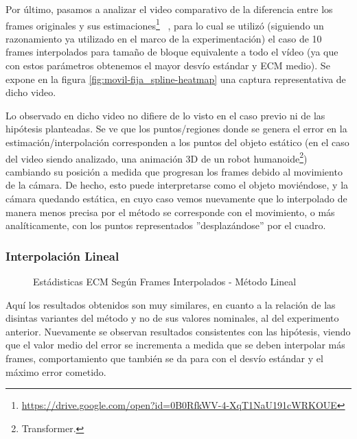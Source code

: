 \par Por \'ultimo, pasamos a analizar el video comparativo de la diferencia
entre los frames originales y sus
estimaciones\footnote{\url{https://drive.google.com/open?id=0B0RfkWV-4-XqT1NaU191cWRKOUE}}
~, para lo cual se utiliz\'o (siguiendo un razonamiento ya utilizado en el marco
de la experimentaci\'on) el caso de 10 frames interpolados para tama\~no de
bloque equivalente a todo el v\'ideo (ya que con estos par\'ametros obtenemos
el mayor desv\'io est\'andar y ECM medio). Se expone en la figura
\ref{fig:movil-fija_spline-heatmap} una captura representativa de dicho video.

\par Lo observado en dicho video no difiere de lo visto en el caso previo ni de
las hip\'otesis planteadas. Se ve que los puntos/regiones donde se genera el
error en la estimaci\'on/interpolaci\'on corresponden a los puntos del objeto
est\'atico (en el caso del video siendo analizado, una animaci\'on 3D de un
robot humanoide\footnote{Transformer.}) cambiando su posici\'on a medida que
progresan los frames debido al movimiento de la c\'amara. De hecho, esto puede
interpretarse como el objeto movi\'endose, y la c\'amara quedando est\'atica,
en cuyo caso vemos nuevamente que lo interpolado de manera menos precisa por el
m\'etodo se corresponde con el movimiento, o m\'as anal\'iticamente, con los
puntos representados ''desplaz\'andose'' por el cuadro.

\subsubsection{Interpolaci\'on Lineal}

\begin{figure}[H]
    \centering
    \caption{Est\'adisticas ECM Seg\'un Frames Interpolados - M\'etodo Lineal}
    \label{fig:movil-fija_lineal-mse_estadisticas}
\end{figure}

\par Aqu\'i los resultados obtenidos son muy similares, en cuanto a la relaci\'on
de las disintas variantes del m\'etodo y no de sus valores nominales, al del
experimento anterior. Nuevamente se observan resultados consistentes con las
hip\'otesis, viendo que el valor medio del error se incrementa a medida que
se deben interpolar m\'as frames, comportamiento que tambi\'en se da para con
el desv\'io est\'andar y el m\'aximo error cometido.

